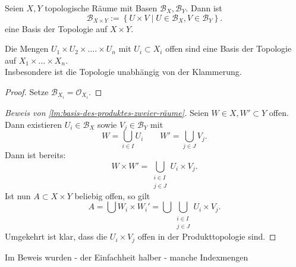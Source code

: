 \begin{lemma}\label{lm:basis-des-produktes-zweier-räume}
    Seien $X,Y$ topologische Räume mit Basen  $\mathcal{B}_X, \mathcal{B}_Y$. Dann ist
    \[
    \mathcal{B}_{X\times Y} := \left \{U\times V \mid  U\in \mathcal{B}_X, V\in \mathcal{B}_Y\right\} 
    .\] 
    eine Basis der Topologie auf $X\times Y$.
\end{lemma}
\begin{corollary*}\label{cor:basis-endlicher-produkte}
    Die Mengen $U_1\times U_2\times \ldots.\times U_n$ mit $U_i\subset X_i$ offen sind eine Basis der Topologie auf $X_1\times \ldots\times X_n$. \\
    Insbesondere ist die Topologie unabhängig von der Klammerung.
\end{corollary*}
\begin{proof}
    Setze $\mathcal{B}_{X_i} = \mathcal{O}_{X_i}$.
\end{proof}
\begin{proof}[Beweis von \autoref{lm:basis-des-produktes-zweier-räume}]
    Seien $W\in X, W'\subset Y$ offen. Dann existieren $U_i \in \mathcal{B}_X$ sowie $V_j \in \mathcal{B}_Y$ mit
    \[
    W = \bigcup_{i \in  I} U_i \qquad W' = \bigcup_{j\in J} V_j 
    .\] 
    Dann ist bereits:
    \[
    W \times W' = \bigcup_{\substack{i\in I \\j\in J} } U_i \times V_j
    .\] 
    Ist nun $A\subset X\times Y$ beliebig offen, so gilt
    \[
    A = \bigcup W_i \times W_i' = \bigcup  \bigcup_{\substack{i\in I\\j\in J}  } U_i \times V_j
    .\] 
    Umgekehrt ist klar, dass die $U_i\times V_j$ offen in der Produkttopologie sind.
\end{proof}
\begin{remark*}
    Im Beweis wurden - der Einfachheit halber - manche Indexmengen  
\end{remark*}

